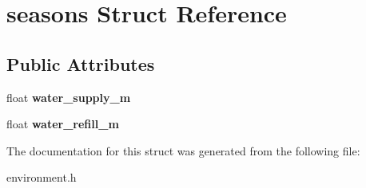 \hypertarget{structseasons}{}\section{seasons Struct Reference}
\label{structseasons}
\subsection*{Public Attributes}
\begin{DoxyCompactItemize}
\item 
\mbox{\label{structseasons_a64ee7f79620419786e3968f686111823}} 
float {\bfseries water\+\_\+supply\+\_\+m}
\item 
\mbox{\label{structseasons_aed69f632e642ef16f4c620efc8a1922f}} 
float {\bfseries water\+\_\+refill\+\_\+m}
\end{DoxyCompactItemize}


The documentation for this struct was generated from the following file\+:\begin{DoxyCompactItemize}
\item 
environment.\+h\end{DoxyCompactItemize}
